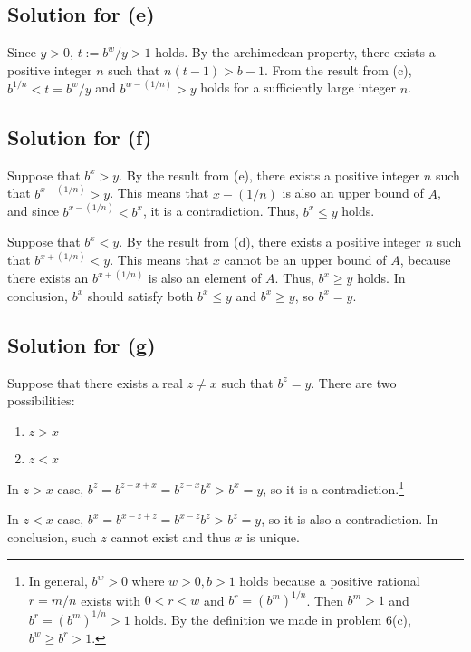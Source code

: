 \documentclass{scrartcl}
\begin{document}
\subsection{Solution for (e)}
Since \(y > 0\), \(t := b^w / y > 1\) holds.
By the archimedean property, there exists a positive integer \(n\) such that \(n(t - 1) > b - 1\).
From the result from (c), \(b^{1 / n} < t = b^w / y\) and \(b^{w - (1 / n)} > y\) holds for a sufficiently large integer \(n\).

\subsection{Solution for (f)}
Suppose that \(b^x > y\).
By the result from (e), there exists a positive integer \(n\) such that \(b^{x - (1 / n)} > y\).
This means that \(x - (1 / n)\) is also an upper bound of \(A\), and since \(b^{x - (1 / n)} < b^x\), it is a contradiction.
Thus, \(b^x \leq y\) holds.

Suppose that \(b^x < y\).
By the result from (d), there exists a positive integer \(n\) such that \(b^{x + (1 / n)} < y\).
This means that \(x\) cannot be an upper bound of \(A\), because there exists an \(b^{x + (1 / n)}\) is also an element of \(A\).
Thus, \(b^x \geq y\) holds.
In conclusion, \(b^x\) should satisfy both \(b^x \leq y\) and \(b^x \geq y\), so \(b^x = y\).

\subsection{Solution for (g)}
Suppose that there exists a real \(z \not = x\) such that \(b^z = y\).
There are two possibilities:

\begin{enumerate}
  \item \(z > x\)
  \item \(z < x\)
\end{enumerate}

In \(z > x\) case, \(b^z = b^{z - x + x} = b^{z - x} b^x > b^x = y\), so it is a contradiction.\footnote{
  In general, \(b^w > 0\) where \(w > 0, b > 1\) holds because a positive rational \(r = m / n\) exists with \(0 < r < w\) and \(b^r = (b^m)^{1 / n}\).
  Then \(b^m > 1\) and \(b^r = (b^m)^{1 / n} > 1\) holds.
  By the definition we made in problem 6(c), \(b^w \geq b^r > 1\).
}

In \(z < x\) case, \(b^x = b^{x - z + z} = b^{x - z} b^z > b^z = y\), so it is also a contradiction. In conclusion, such \(z\) cannot exist and thus \(x\) is unique.
\end{document}
